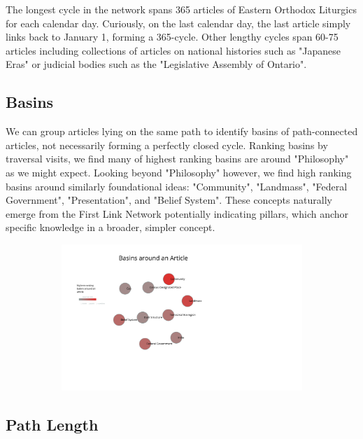 \documentclass[twoside]{article}
\begin{document}
The longest cycle in the network spans 365 articles of Eastern Orthodox Liturgics for each calendar day. 
Curiously, on the last calendar day, the last article simply links back to January 1, forming a 365-cycle.
Other lengthy cycles span 60-75 articles including collections of articles on national histories such as "Japanese Eras" 
or judicial bodies such as the "Legislative Assembly of Ontario".


\subsection{Basins}
We can group articles lying on the same path to identify basins of path-connected articles, not necessarily forming a perfectly closed cycle.
Ranking basins by traversal visits, we find many of highest ranking basins are around "Philosophy" as we might expect. 
Looking beyond "Philosophy" however, we find high ranking basins around similarly foundational ideas:
"Community", "Landmass", "Federal Government", "Presentation", and "Belief System". 
These concepts naturally emerge from the First Link Network potentially indicating pillars, which 
anchor specific knowledge in a broader, simpler concept.

\begin{figure}[H]
\centering
\caption{highest ranking 3-Cycles}
    \begin{subfigure}[b]{0.8\textwidth}
        \includegraphics[width=\textwidth]{graphics/basins.pdf}
    \end{subfigure}
\end{figure}

\subsection{Path Length}
\end{document}
